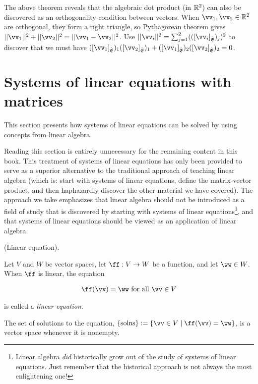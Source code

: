 \begin{remark}
    The above theorem reveals that the algebraic dot product (in $\mathbb{R}^2$) can also be discovered as an orthogonality condition between vectors. When $\vv_1, \vv_2 \in \R^2$ are orthogonal, they form a right triangle, so Pythagorean theorem gives $||\vv_1||^2 + ||\vv_2||^2 = ||\vv_1 - \vv_2||^2$. Use $||\vv_i||^2 = \sum_{j = 1}^2 (([\vv_i]_\sE)_j)^2$ to discover that we must have $([\vv_1]_\sE)_1 ([\vv_2]_\sE)_1 + ([\vv_1]_\sE)_2 ([\vv_2]_\sE)_2 = 0$.
\end{remark}

\newpage

\section{Systems of linear equations with matrices}

This section presents how systems of linear equations can be solved by using concepts from linear algebra.

Reading this section is entirely unnecessary for the remaining content in this book. This treatment of systems of linear equations has only been provided to serve as a superior alternative to the traditional approach of teaching linear algebra (which is: start with systems of linear equations, define the matrix-vector product, and then haphazardly discover the other material we have covered). The approach we take emphasizes that linear algebra should not be introduced as a field of study that is discovered by starting with systems of linear equations\footnote{Linear algebra \textit{did} historically grow out of the study of systems of linear equations. Just remember that the historical approach is not always the most enlightening one!}, and that systems of linear equations should be viewed as an application of linear algebra.

\begin{defn}
    (Linear equation).

    Let $V$ and $W$ be vector spaces, let $\ff:V \rightarrow W$ be a function, and let $\ww \in W$. When $\ff$ is linear, the equation
    
    \begin{align*}
        \ff(\vv) = \ww \text{ for all $\vv \in V$}
    \end{align*}
    
    is called a \textit{linear equation}.

    The set of solutions to the equation, $\{\text{solns}\} := \{\vv \in V \mid \ff(\vv) = \ww\}$, is a vector space whenever it is nonempty.
\end{defn}

